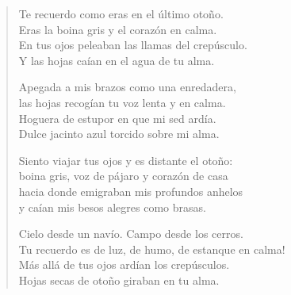 \documentclass[12pt]{article}
\begin{document}
\clearpage
{}
\begin{verse}

Te recuerdo como eras en el último otoño.\\
Eras la boina gris y el corazón en calma.\\
En tus ojos peleaban las llamas del crepúsculo.\\
Y las hojas caían en el agua de tu alma.  

Apegada a mis brazos como una enredadera,\\
las hojas recogían tu voz lenta y en calma.\\
Hoguera de estupor en que mi sed ardía.\\
Dulce jacinto azul torcido sobre mi alma.  

Siento viajar tus ojos y es distante el otoño:\\
boina gris, voz de pájaro y corazón de casa\\
hacia donde emigraban mis profundos anhelos\\
y caían mis besos alegres como brasas.  

Cielo desde un navío. Campo desde los cerros.\\
Tu recuerdo es de luz, de humo, de estanque en calma!\\
Más allá de tus ojos ardían los crepúsculos.\\
Hojas secas de otoño giraban en tu alma.

\end{verse}
\end{document}
